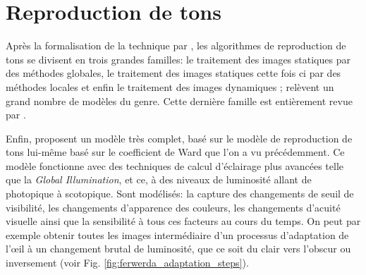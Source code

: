	\section{Reproduction de tons}
	\par Après la formalisation de la technique par \citep{rushmeier_comparing_1995}, les algorithmes de reproduction de tons se divisent en trois grandes familles: le traitement des images statiques par des méthodes globales, le traitement des images statiques cette fois ci par des méthodes locales et enfin le traitement des images dynamiques ; \citep{moreau_traite_2006} relèvent un grand nombre de modèles du genre. Cette dernière famille est entièrement revue par \citep{drago_perceptual_2003}.
	
	\par Enfin, \citep{ferwerda_model_1996} proposent un modèle très complet, basé sur le modèle de reproduction de tons lui-même basé sur le coefficient de Ward que l'on a vu précédemment. Ce modèle fonctionne avec des techniques de calcul d'éclairage plus avancées telle que la \textit{Global Illumination}, et ce, à des niveaux de luminosité allant de photopique à scotopique. Sont modélisés: la capture des changements de seuil de visibilité, les changements d'apparence des couleurs, les changements d'acuité visuelle ainsi que la sensibilité à tous ces facteurs au cours du temps. On peut par exemple obtenir toutes les images intermédiaire d'un processus d'adaptation de l'œil à un changement brutal de luminosité, que ce soit du clair vers l'obscur ou inversement (voir Fig. \ref{fig:ferwerda_adaptation_steps}).
	
